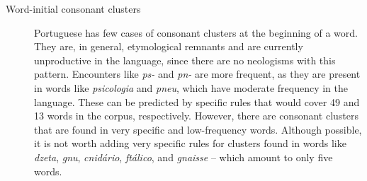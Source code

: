 \begin{description}
    \item [Word-initial consonant clusters\label{word-init-cc}] Portuguese has few cases of
	consonant clusters at the beginning of a word. They are, in general, 
	etymological remnants and are currently unproductive in the language,
	since there are no neologisms with this pattern. Encounters like
	\emph{ps-} and \emph{pn-} are more frequent, as they are present in
	words like \emph{psicologia} and \emph{pneu}, which have moderate 
	frequency in the language. These can be predicted by specific rules that would cover  
	49 and 13 words in the corpus, respectively.
	However, there are consonant clusters that are
	found in very specific and low-frequency words. Although possible, it
	is not worth adding very specific rules for clusters found in words like
	\emph{dzeta}, \emph{gnu}, \emph{cnidário},
	\emph{ftálico}, and \emph{gnaisse} -- which amount to only five words.


\end{description}
